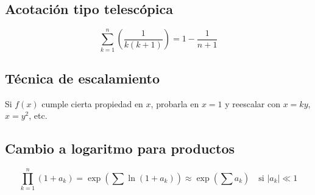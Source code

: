 \documentclass[12pt]{article}
\begin{document}
\subsection{Acotación tipo telescópica}
\[
\sum_{k=1}^n \left( \frac{1}{k(k+1)} \right) = 1 - \frac{1}{n+1}
\]

\subsection{Técnica de escalamiento}
Si \(f(x)\) cumple cierta propiedad en \(x\), probarla en \(x = 1\) y reescalar con \(x = ky\), \(x = y^2\), etc.

\subsection{Cambio a logaritmo para productos}
\[
\prod_{k=1}^n (1 + a_k) = \exp\left( \sum \ln(1 + a_k) \right) \approx \exp\left( \sum a_k \right)
\quad \text{si } |a_k| \ll 1
\]
\end{document}

